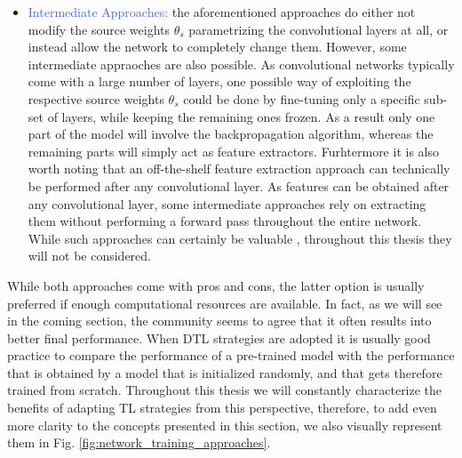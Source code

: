 \begin{itemize}
	\item \textcolor{RoyalBlue}{Intermediate Approaches:} the aforementioned approaches do either not modify the source weights $\theta_s$ parametrizing the convolutional layers at all, or instead allow the network to completely change them. However, some intermediate appraoches are also possible. As convolutional networks typically come with a large number of layers, one possible way of exploiting the respective source weights $\theta_s$ could be done by fine-tuning only a specific sub-set of layers, while keeping the remaining ones frozen. As a result only one part of the model will involve the backpropagation algorithm, whereas the remaining parts will simply act as feature extractors. Furhtermore it is also worth noting that an off-the-shelf feature extraction approach can technically be performed after any convolutional layer. As features can be obtained after any convolutional layer, some intermediate approaches rely on extracting them without performing a forward pass throughout the entire network. While such approaches can certainly be valuable \cite{mormont2018comparison,sasso2021fractional}, throughout this thesis they will not be considered. 


\end{itemize}

While both approaches come with pros and cons, the latter option is usually preferred if enough computational resources are available. In fact, as we will see in the coming section, the community seems to agree that it often results into better final performance. When DTL strategies are adopted it is usually good practice to compare the performance of a pre-trained model with the performance that is obtained by a model that is initialized randomly, and that gets therefore trained from scratch. Throughout this thesis we will constantly characterize the benefits of adapting TL strategies from this perspective, therefore, to add even more clarity to the concepts presented in this section, we also visually represent them in Fig. \ref{fig:network_training_approaches}. 

